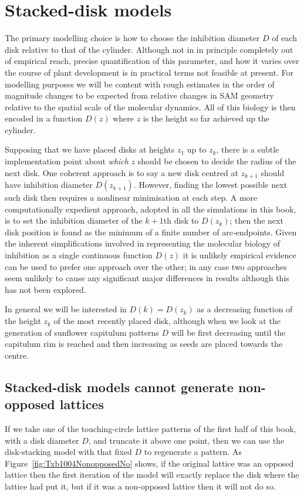 \section{Stacked-disk models}
The primary modelling choice is how to choose the inhibition diameter $D$ of each disk relative to that of the cylinder.
Although not in in principle completely out of empirical reach, precise quantification of this parameter, and how it varies over the course of plant development is in practical terms not feasible at present. For modelling purposes we will be content with rough estimates in the order of magnitude changes to be expected from  relative changes in SAM geometry relative to the spatial scale of the molecular dynamics. All of this biology is then encoded in a function $D(z)$ where $z$ is the height so far achieved up the cylinder.

Supposing that we have placed disks at heights $z_1$ up to $z_k$, there is a subtle implementation point about \textit{which} $z$ should be chosen to decide the radius of the next disk. One coherent approach is to say a new disk centred at $z_{k+1}$ should have inhibition diameter $D(z_{k+1})$. However, finding the lowest possible next such disk then requires a nonlinear minimisation at each step. A more computationally expedient approach, adopted in all the simulations in this book, is to set the inhibition diameter of the $k+1$th disk to $D(z_k)$; then the next disk position is found as the minimum of a finite number of arc-endpoints. Given the inherent simplifications involved in representing the molecular biology of inhibition as a single continuous function $D(z)$ it is unlikely empirical evidence can be used to prefer one approach over the other; in any case two approaches seem unlikely to cause any significant major differences in results although this has not been explored. 

In general we will be interested in $D(k)=D(z_k)$ as a decreasing function of the height $z_k$ of the most recently placed disk, although when we look at the generation of sunflower capitulum patterns $D$ will be first decreasing until the capitulum rim is reached and then increasing as seeds are placed towards the centre. 


\subsection{Stacked-disk models cannot generate non-opposed lattices}
If we take one of the touching-circle lattice patterns of the first half of this book, with a disk diameter $D$, and truncate it above one point, then
we can use the disk-stacking model with that fixed $D$ to regenerate a pattern. As Figure~\ref{fig:Txb1004NonopposedNo} shows, if the original lattice was an opposed lattice then the first iteration of the model will exactly replace the disk where the lattice had put it, but if it was a non-opposed lattice then it will not do so.

